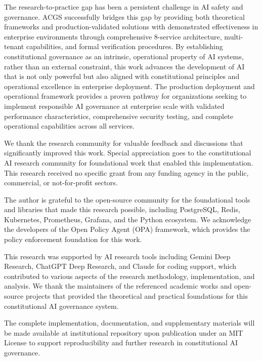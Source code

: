 \documentclass[manuscript,screen,9pt]{acmart}
\begin{document}
The research-to-practice gap has been a persistent challenge in AI safety and governance. ACGS successfully bridges this gap by providing both theoretical frameworks and production-validated solutions with demonstrated effectiveness in enterprise environments through comprehensive 8-service architecture, multi-tenant capabilities, and formal verification procedures. By establishing constitutional governance as an intrinsic, operational property of AI systems, rather than an external constraint, this work advances the development of AI that is not only powerful but also aligned with constitutional principles and operational excellence in enterprise deployment. The production deployment and operational framework provides a proven pathway for organizations seeking to implement responsible AI governance at enterprise scale with validated performance characteristics, comprehensive security testing, and complete operational capabilities across all services.

\begin{acks}
	We thank the research community for valuable feedback and discussions that significantly improved this work. Special appreciation goes to the constitutional AI research community for foundational work that enabled this implementation. This research received no specific grant from any funding agency in the public, commercial, or not-for-profit sectors.

	The author is grateful to the open-source community for the foundational tools and libraries that made this research possible, including PostgreSQL, Redis, Kubernetes, Prometheus, Grafana, and the Python ecosystem. We acknowledge the developers of the Open Policy Agent (OPA) framework, which provides the policy enforcement foundation for this work.

	This research was supported by AI research tools including Gemini Deep Research, ChatGPT Deep Research, and Claude for coding support, which contributed to various aspects of the research methodology, implementation, and analysis. We thank the maintainers of the referenced academic works and open-source projects that provided the theoretical and practical foundations for this constitutional AI governance system.

	The complete implementation, documentation, and supplementary materials will be made available at institutional repository upon publication under an MIT License to support reproducibility and further research in constitutional AI governance.
\end{acks}
\end{document}

